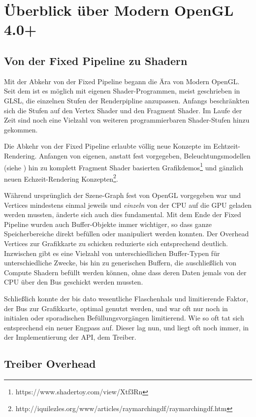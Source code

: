 \chapter{Überblick über Modern OpenGL 4.0+}
\label{cha:modern-opengl}

\section{Von der Fixed Pipeline zu Shadern}
Mit der Abkehr von der Fixed Pipeline begann die Ära von Modern OpenGL. Seit dem ist es möglich mit eigenen Shader-Programmen, meist geschrieben in GLSL, die einzelnen Stufen der Renderpipline anzupassen. Anfangs beschränkten sich die Stufen auf den Vertex Shader und den Fragment Shader. Im Laufe der Zeit sind noch eine Vielzahl von weiteren programmierbaren Shader-Stufen hinzu gekommen.

Die Abkehr von der Fixed Pipeline erlaubte völlig neue Konzepte im Echtzeit-Rendering. Anfangen von eigenen, anstatt fest vorgegeben, Beleuchtungsmodellen (siehe ) hin zu komplett Fragment Shader basierten Grafikdemos\footnote{https://www.shadertoy.com/view/Xtf3Rn} und gänzlich neuen Echzeit-Rendering Konzepten\footnote{http://iquilezles.org/www/articles/raymarchingdf/raymarchingdf.htm}.

Während ursprünglich der Szene-Graph fest von OpenGL vorgegeben war und Vertices mindestens einmal jeweils und \textit{einzeln} von der CPU auf die GPU geladen werden mussten, änderte sich auch dies fundamental. Mit dem Ende der Fixed Pipeline wurden auch Buffer-Objekte immer wichtiger, so dass ganze Speicherbereiche direkt befüllen oder manipuliert werden konnten. Der Overhead Vertices zur Grafikkarte zu schicken reduzierte sich entsprechend deutlich. Inzwischen gibt es eine Vielzahl von unterschiedlichen Buffer-Typen für unterschiedliche Zwecke, bis hin zu generischen Buffern, die auschließlich von Compute Shadern befüllt werden können, ohne dass deren Daten jemals von der CPU über den Bus geschickt werden mussten.

Schließlich konnte der bis dato wesentliche Flaschenhals und limitierende Faktor, der Bus zur Grafikkarte, optimal genutzt werden, und war oft nur noch in initialen oder sporadischen Befüllungsvorgängen limitierend. Wie so oft tat sich entsprechend ein neuer Engpass auf. Dieser lag nun, und liegt oft noch immer, in der Implementierung der API, dem Treiber.

\section{Treiber Overhead}

